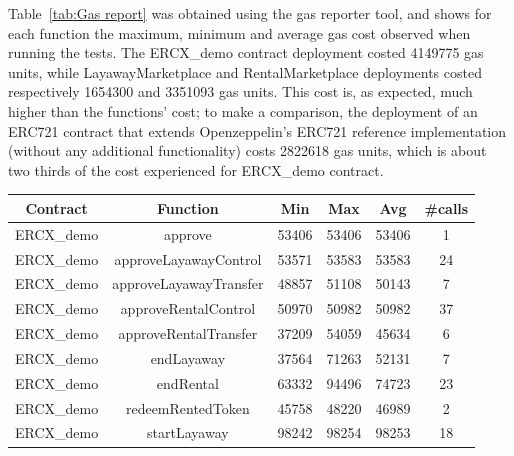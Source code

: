 \documentclass[english, LaM, oneside]{sapthesis}%
\begin{document}
Table~\ref{tab:Gas report} was obtained using the gas reporter tool, and shows for each function the maximum, minimum and average gas cost observed when running the tests.\newline
The ERCX\_demo contract deployment costed 4149775 gas units, while LayawayMarketplace and RentalMarketplace deployments costed respectively 1654300 and 3351093 gas units. This cost is, as expected, much higher than the functions' cost; to make a comparison, the deployment of an ERC721 contract that extends Openzeppelin's ERC721 reference implementation (without any additional functionality) costs 2822618 gas units, which is about two thirds of the cost experienced for ERCX\_demo contract.

\begin{table}
\centering
\begin{adjustbox}{width=0.75\textwidth}
\small
\begin{tabular}{@{}cccccc@{}}
\toprule
\textbf{Contract}  & \textbf{Function}            & \textbf{Min} & \textbf{Max} & \textbf{Avg} & \textbf{\#calls} \\ \midrule
ERCX\_demo               & approve                      & 53406        & 53406        & 53406        & 1                \\
ERCX\_demo              & approveLayawayControl        & 53571        & 53583        & 53583        & 24               \\
ERCX\_demo               & approveLayawayTransfer       & 48857        & 51108        & 50143        & 7                \\
ERCX\_demo               & approveRentalControl         & 50970        & 50982        & 50982        & 37               \\
ERCX\_demo               & approveRentalTransfer        & 37209        & 54059        & 45634        & 6                \\
ERCX\_demo               & endLayaway                   & 37564        & 71263        & 52131        & 7                \\
ERCX\_demo               & endRental                    & 63332        & 94496        & 74723        & 23               \\
ERCX\_demo               & redeemRentedToken            & 45758        & 48220        & 46989        & 2                \\
ERCX\_demo               & startLayaway                 & 98242        & 98254        & 98253        & 18               \\

\end{tabular}
\end{adjustbox}
\end{table}
\end{document}
